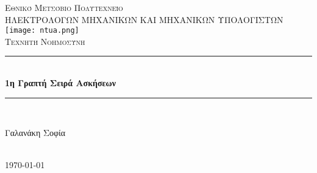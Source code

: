 \documentclass[12pt]{article}
\begin{document}
\begin{titlepage}

\newcommand{\HRule}{\rule{\linewidth}{0.5mm}} 

\center 

\textsc{\LARGE Εθνικό Μετσόβιο Πολυτεχνείο}\\[1.5cm] 
\textsc{\large ΗΛΕΚΤΡΟΛΟΓΩΝ ΜΗΧΑΝΙΚΩΝ ΚΑΙ ΜΗΧΑΝΙΚΩΝ ΥΠΟΛΟΓΙΣΤΩΝ}\\[1.5cm] 
\texttt{[image: ntua.png]}\\[2cm] 
\textsc{\Large Τεχνητή Νοημοσύνη}\\[1cm] 
\hfill \break

\HRule \\[0.4cm]
{ \huge \bfseries 1η Γραπτή Σειρά Ασκήσεων }\\[0.4cm] 
\HRule \\[1.5cm]
 
\hfill \break
\begin{minipage}{0.4\textwidth}
\begin{flushleft} \large
\centering  Γαλανάκη Σοφία\\
\end{flushleft}
\hfill \break
\hfill \break
\hfill \break
\hfill \break

\end{minipage}\\[2.5cm]

{\large \today}\\[2cm] 

\vfill 

\end{titlepage}
\end{document}
